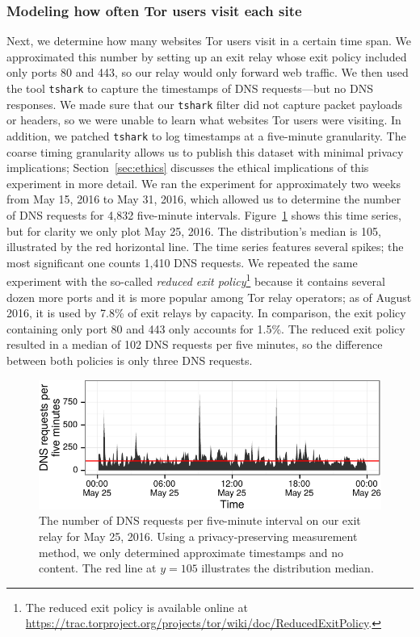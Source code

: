 \subsubsection{Modeling how often Tor users visit each site}
\label{sec:load-freq}
Next, we determine how many websites Tor users visit in a certain time span.
We approximated this number by setting up an exit relay whose exit policy
included only ports 80 and 443, so our relay would only forward web traffic.  We
then used the tool {\tt tshark} to capture the timestamps of DNS requests---but
no DNS responses.  We made sure that our {\tt tshark} filter did not capture
packet payloads or headers, so we were unable to learn what websites Tor users
were visiting.  In addition, we patched {\tt tshark} to log timestamps at a
five-minute granularity. The coarse timing granularity allows us to publish this
dataset with minimal privacy implications; Section~\ref{sec:ethics} discusses
the ethical implications of this experiment in more detail.  We ran the
experiment for approximately two weeks from May 15, 2016 to May 31, 2016, which
allowed us to determine the number of DNS requests for 4,832 five-minute
intervals.  Figure~\ref{fig:dns-reqs} shows this time series, but for clarity we
only plot May 25, 2016.  The distribution's median is 105, illustrated by the
red horizontal line.  The time series features several spikes; the most
significant one counts 1,410 DNS requests.  We repeated the same experiment with
the so-called \emph{reduced exit policy}\footnote{The reduced exit policy is
	available online at
\url{https://trac.torproject.org/projects/tor/wiki/doc/ReducedExitPolicy}.}
because it contains several dozen more ports and it is more popular among Tor
relay operators; as of August 2016, it is used by 7.8\% of exit relays by
capacity.  In comparison, the exit policy containing only port 80 and 443 only
accounts for 1.5\%.  The reduced exit policy resulted in a median of 102 DNS
requests per five minutes, so the difference between both policies is only three
DNS requests.

\begin{figure}[t]
	\centering
	\includegraphics[width=\linewidth]{figures/dns-reqs.pdf}
	\caption{The number of DNS requests per five-minute interval on our
	exit relay for May 25, 2016.  Using a privacy-preserving measurement method,
	we only determined approximate timestamps and no content.  The red line at
	$y = 105$ illustrates the distribution median.}
	\label{fig:dns-reqs}
\end{figure}

